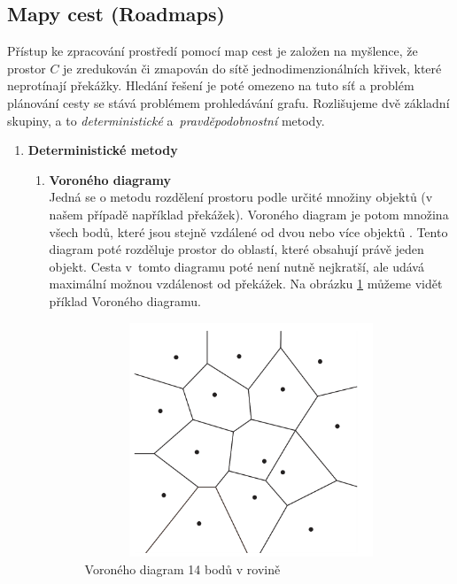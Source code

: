 \subsection{Mapy cest (Roadmaps)}
Přístup ke zpracování prostředí pomocí map cest je založen na myšlence, že prostor $C$ je zredukován či zmapován do sítě jednodimenzionálních křivek, které neprotínají překážky. Hledání řešení je poté omezeno na tuto síť a problém plánování cesty se stává problémem prohledávání grafu. Rozlišujeme dvě základní skupiny, a to \textit{deterministické} a~\textit{pravděpodobnostní} metody.
\begin{enumerate}
	\item \textbf{Deterministické metody}
	\begin{enumerate}
		\item \textbf{Voroného diagramy}\\
		Jedná se o metodu rozdělení prostoru podle určité množiny objektů (v našem případě například překážek). Voroného diagram je potom množina všech bodů, které jsou stejně vzdálené od dvou nebo více objektů \cite{Yan20130104,Opfer20111202}. Tento diagram poté rozděluje prostor do oblastí, které obsahují právě jeden objekt. Cesta v~tomto diagramu poté není nutně nejkratší, ale udává maximální možnou vzdálenost od překážek. Na obrázku \ref{obr:voronoi} můžeme vidět příklad Voroného diagramu.
		\begin{figure}[h!]
			\begin{center}
				\includegraphics*[width=15cm,height=7cm,keepaspectratio]{obr/voronoi}
			\end{center}
			\caption{Voroného diagram 14 bodů v rovině \cite{Opfer20111202}}
			\label{obr:voronoi}
		\end{figure}
	

\end{enumerate}
\end{enumerate}
